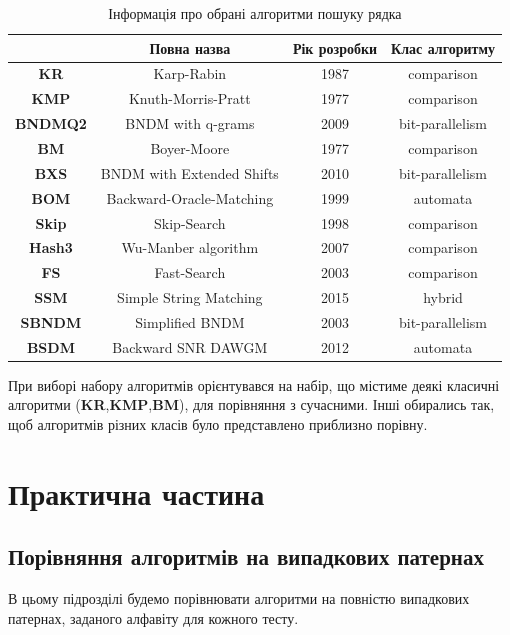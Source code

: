 \documentclass[a4paper,14pt]{extarticle} %
\begin{document}
	\begin{table}[H]
		\centering
		\small
		\begin{tabular}{|c|c|c|c|}
			\hline
			& \textbf{Повна назва} & \textbf{Рік розробки} & \textbf{Клас алгоритму} \\ 
			\hline
			\textbf{KR} & Karp-Rabin & 1987 & comparison \\ 
			\hline
			\textbf{KMP} & Knuth-Morris-Pratt & 1977 & comparison \\ 
			\hline
			\textbf{BNDMQ2} & BNDM with q-grams & 2009 & bit-parallelism \\ 
			\hline
			\textbf{BM} & Boyer-Moore & 1977 & comparison \\ 
			\hline
			\textbf{BXS} & BNDM with Extended Shifts &  2010 & bit-parallelism \\ 
			\hline
			\textbf{BOM} &  Backward-Oracle-Matching & 1999 & automata \\ 
			\hline
			\textbf{Skip} & Skip-Search  & 1998 & comparison \\ 
			\hline
			\textbf{Hash3} & Wu-Manber algorithm	 & 2007 & comparison \\ 
			\hline
			\textbf{FS} & Fast-Search &  2003 & comparison \\ 
			\hline
			\textbf{SSM} & Simple String Matching & 2015 & hybrid \\ 
			\hline
			\textbf{SBNDM} & Simplified BNDM & 2003 & bit-parallelism \\ 
			\hline
			\textbf{BSDM} & Backward SNR DAWGM & 2012 & automata \\ 
			\hline
		\end{tabular}
		\caption{Інформація про обрані алгоритми пошуку рядка}
		\label{table:string_algorithms}
	\end{table}

	При виборі набору алгоритмів орієнтувався на набір, що містиме деякі класичні алгоритми (\textbf{KR},\textbf{KMP},\textbf{BM}), для порівняння з сучасними. Інші обирались так, щоб алгоритмів різних класів було представлено приблизно порівну.

	
	\newpage
	\section{Практична частина}
	
	\subsection{Порівняння алгоритмів на випадкових патернах}
	В цьому підрозділі будемо порівнювати алгоритми на повністю випадкових патернах, заданого алфавіту для кожного тесту. 
\end{document}
